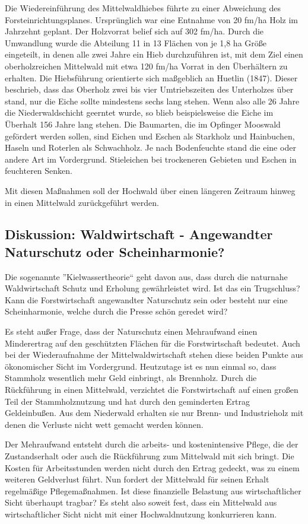 \documentclass[12pt]{article}
\begin{document}
Die Wiedereinführung des Mittelwaldhiebes führte zu einer Abweichung des Forsteinrichtungsplanes.
Ursprünglich war eine Entnahme von 20 fm/ha Holz im Jahrzehnt geplant. Der Holzvorrat belief sich auf 302 fm/ha. 
Durch die Umwandlung wurde die Abteilung 11 in 13 Flächen von je 1,8 ha Größe eingeteilt, in denen alle zwei 
Jahre ein Hieb durchzuführen ist, mit dem Ziel einen oberholzreichen Mittelwald mit etwa 120 fm/ha Vorrat in den
Überhältern zu erhalten. Die Hiebsführung orientierte sich maßgeblich an Huetlin (1847). Dieser beschrieb, dass
das Oberholz zwei bis vier Umtriebszeiten des Unterholzes über stand, nur die Eiche sollte mindestens sechs lang 
stehen. Wenn also alle 26 Jahre die Niederwaldschicht geerntet wurde, so blieb beispielsweise die Eiche im Überhalt 
156 Jahre lang stehen. Die Baumarten, die im Opfinger Mooswald gefördert werden sollen, sind Eichen und Eschen
als Starkholz und Hainbuchen, Haseln und Roterlen als Schwachholz. Je nach Bodenfeuchte stand die eine oder andere
Art im Vordergrund. Stieleichen bei trockeneren Gebieten und Eschen in feuchteren Senken.

Mit diesen Maßnahmen soll der Hochwald über einen längeren Zeitraum hinweg in einen Mittelwald zurückgeführt werden.


\subsection*{Diskussion: Waldwirtschaft - Angewandter Naturschutz oder Scheinharmonie?}
Die sogenannte ''Kielwassertheorie`` geht davon aus, dass durch die naturnahe Waldwirtschaft
Schutz und Erholung gewährleistet wird. Ist das ein Trugschluss? Kann die Forstwirtschaft 
angewandter Naturschutz sein oder besteht nur eine Scheinharmonie, welche durch die Presse 
schön geredet wird?

Es steht außer Frage, dass der Naturschutz einen Mehraufwand einen Minderertrag auf den
geschützten Flächen für die Forstwirtschaft bedeutet. Auch bei der Wiederaufnahme der 
Mittelwaldwirtschaft stehen diese beiden Punkte aus ökonomischer Sicht im Vordergrund. 
Heutzutage ist es nun einmal so, dass Stammholz wesentlich mehr Geld einbringt, als Brennholz.
Durch die Rückführung in einen Mittelwald, verzichtet die Forstwirtschaft auf einen
großen Teil der Stammholznutzung und hat durch den geminderten Ertrag Geldeinbußen. Aus dem
Niederwald erhalten sie nur Brenn- und Industrieholz mit denen die Verluste nicht wett gemacht 
werden können. 

Der Mehraufwand entsteht durch die arbeits- und kostenintensive Pflege, die der Zustandserhalt oder auch
die Rückführung zum Mittelwald mit sich bringt. Die Kosten für Arbeitsstunden werden nicht durch
den Ertrag gedeckt, was zu einem weiteren Geldverlust führt. Nun fordert der Mittelwald für seinen
Erhalt regelmäßige Pflegemaßnahmen. Ist diese finanzielle Belastung aus wirtschaftlicher Sicht überhaupt tragbar?
Es steht also soweit fest, dass ein Mittelwald aus wirtschaftlicher Sicht nicht 
mit einer Hochwaldnutzung konkurrieren kann.
\end{document}
